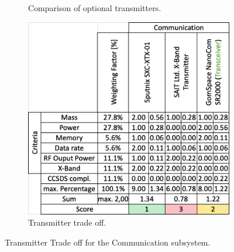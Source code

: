 \begin{figure}[h]
\begin{subfigure}[b]{0.49\textwidth}
         \caption{Comparison of optional transmitters.}
         \label{fig:Values_trans}
     \end{subfigure}
     \hfill
     \begin{subfigure}[b]{0.49\textwidth}
         \centering
         \includegraphics[width=\textwidth]{Media/Trade_off/Transmitter/TradeOff_trans.png}
         \caption{Transmitter trade off.}
         \label{fig:TradeOff_trans}
     \end{subfigure}
     \hfill
     \caption{Transmitter Trade off for the Communication subsystem.}
     \label{TrOff_Trans}
\end{figure}


